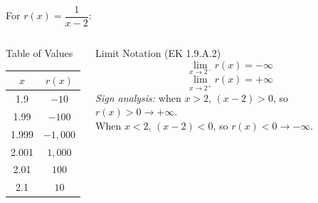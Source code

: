 \documentclass[aspectratio=169, 11pt]{beamer}
\begin{document}
\begin{frame}[t, plain]

  For $r(x) = \dfrac{1}{x - 2}$:

  \bigskip
  \begin{columns}[T]
      \begin{block}{Table of Values}
        \renewcommand{\arraystretch}{1.3}
        \begin{tabular}{|c|c|}
        \hline
        $x$    & $r(x)$ \\
        \hline
        1.9    & $-10$ \\
        1.99   & $-100$ \\
        1.999  & $-1{,}000$ \\
        2.001  & $1{,}000$ \\
        2.01   & $100$ \\
        2.1    & $10$ \\
        \hline
        \end{tabular}
      \end{block}

      \begin{block}{Limit Notation (EK 1.9.A.2)}
        \[
          \lim_{x \to 2^-} r(x) = -\infty
        \]
        \[
          \lim_{x \to 2^+} r(x) = +\infty
        \]
        \medskip
        \textit{Sign analysis:} when $x > 2$, $(x-2) > 0$, so $r(x) > 0 \to +\infty$.\\
        When $x < 2$, $(x-2) < 0$, so $r(x) < 0 \to -\infty$.
      \end{block}
  \end{columns}
\end{frame}
\end{document}
